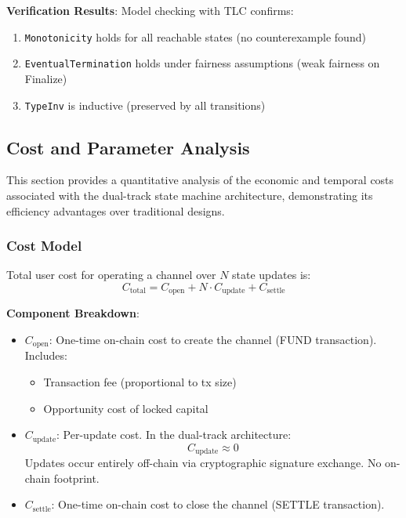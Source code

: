\textbf{Verification Results}: Model checking with TLC confirms:
\begin{enumerate}
    \item \texttt{Monotonicity} holds for all reachable states (no counterexample found)
    \item \texttt{EventualTermination} holds under fairness assumptions (weak fairness on Finalize)
    \item \texttt{TypeInv} is inductive (preserved by all transitions)
\end{enumerate}

\subsection{Cost and Parameter Analysis}

This section provides a quantitative analysis of the economic and temporal costs associated with the dual-track state machine architecture, demonstrating its efficiency advantages over traditional designs.

\subsubsection{Cost Model}

Total user cost for operating a channel over $N$ state updates is:
$$ C_{\mathrm{total}} = C_{\mathrm{open}} + N \cdot C_{\mathrm{update}} + C_{\mathrm{settle}} $$

\textbf{Component Breakdown}:
\begin{itemize}
    \item $C_{\mathrm{open}}$: One-time on-chain cost to create the channel (FUND transaction). Includes:
    \begin{itemize}
        \item Transaction fee (proportional to tx size)
        \item Opportunity cost of locked capital
    \end{itemize}
    
    \item $C_{\mathrm{update}}$: Per-update cost. In the dual-track architecture:
    $$C_{\mathrm{update}} \approx 0$$
    Updates occur entirely off-chain via cryptographic signature exchange. No on-chain footprint.
    
    \item $C_{\mathrm{settle}}$: One-time on-chain cost to close the channel (SETTLE transaction).
\end{itemize}

